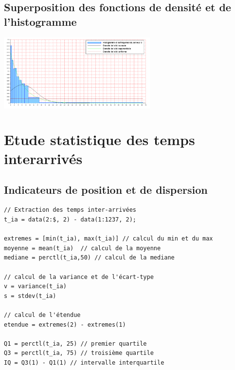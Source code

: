 \documentclass{article}
\begin{document}
\paragraph{}

\subsection{Superposition des fonctions de densité et de l'histogramme}
\begin{center}
\includegraphics[width=300px]{img/S3_densite.png}
\end{center}
\paragraph{}

\newpage
\appendix

\section{Etude statistique des temps interarrivés}

\subsection{Indicateurs de position et de dispersion}
\begin{verbatim}
// Extraction des temps inter-arrivées
t_ia = data(2:$, 2) - data(1:1237, 2);

extremes = [min(t_ia), max(t_ia)] // calcul du min et du max
moyenne = mean(t_ia)  // calcul de la moyenne
mediane = perctl(t_ia,50) // calcul de la mediane

// calcul de la variance et de l'écart-type
v = variance(t_ia)
s = stdev(t_ia)

// calcul de l'étendue
etendue = extremes(2) - extremes(1)

Q1 = perctl(t_ia, 25) // premier quartile
Q3 = perctl(t_ia, 75) // troisième quartile
IQ = Q3(1) - Q1(1) // intervalle interquartile
\end{verbatim}
\end{document}

